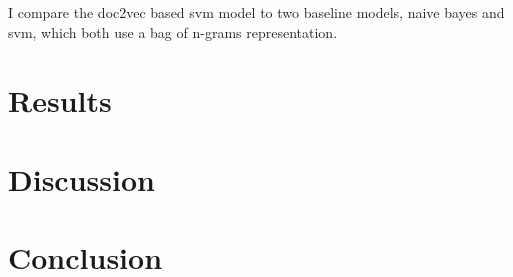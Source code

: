 \documentclass[12pt,a4paper]{article}
\begin{document}
\begin{multicols}{2}
I compare the doc2vec based svm model to two baseline models, naive bayes and svm, which both use a bag of n-grams representation.

\section{Results}
\blindtext
\section{Discussion}
\blindtext
\section{Conclusion}
\blindtext

\end{multicols}

\clearpage


\end{document}
